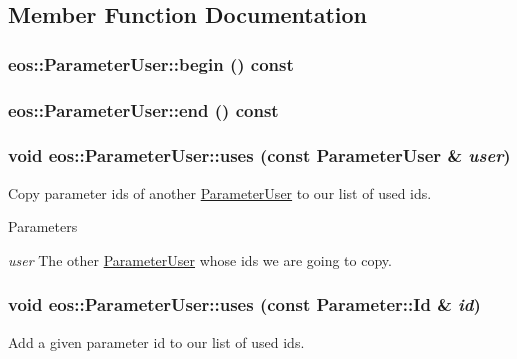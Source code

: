 \subsection{Member Function Documentation}
\hypertarget{classeos_1_1ParameterUser_a9cd569207063cd2a8f807c4e1203a5d4}{
\subsubsection[{begin}]{ eos::ParameterUser::begin () const}}
\label{classeos_1_1ParameterUser_a9cd569207063cd2a8f807c4e1203a5d4}
\hypertarget{classeos_1_1ParameterUser_a5813c886f3fd3f074cc02a53fc9e0790}{
\subsubsection[{end}]{ eos::ParameterUser::end () const}}
\label{classeos_1_1ParameterUser_a5813c886f3fd3f074cc02a53fc9e0790}
\hypertarget{classeos_1_1ParameterUser_a7a37e779cf45ef1075fe7bf670688b72}{
\subsubsection[{uses}]{\setlength{\rightskip}{0pt plus 5cm}void eos::ParameterUser::uses (const {\bf ParameterUser} \& {\em user})}}
\label{classeos_1_1ParameterUser_a7a37e779cf45ef1075fe7bf670688b72}
Copy parameter ids of another \hyperlink{classeos_1_1ParameterUser}{ParameterUser} to our list of used ids.


\begin{DoxyParams}{Parameters}
\item[{\em user}]The other \hyperlink{classeos_1_1ParameterUser}{ParameterUser} whose ids we are going to copy. \end{DoxyParams}
\hypertarget{classeos_1_1ParameterUser_ad91a901e589653272482bded7e453c70}{
\subsubsection[{uses}]{\setlength{\rightskip}{0pt plus 5cm}void eos::ParameterUser::uses (const {\bf Parameter::Id} \& {\em id})}}
\label{classeos_1_1ParameterUser_ad91a901e589653272482bded7e453c70}
Add a given parameter id to our list of used ids.



